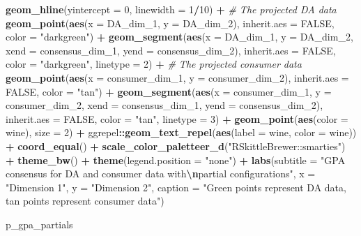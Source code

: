 \documentclass[
]{book}
\newenvironment{Shaded}{\begin{snugshade}}{\end{snugshade}}
\newcommand{\AttributeTok}[1]{\textcolor[rgb]{0.13,0.29,0.53}{#1}}
\newcommand{\CommentTok}[1]{\textcolor[rgb]{0.56,0.35,0.01}{\textit{#1}}}
\newcommand{\ConstantTok}[1]{\textcolor[rgb]{0.56,0.35,0.01}{#1}}
\newcommand{\DecValTok}[1]{\textcolor[rgb]{0.00,0.00,0.81}{#1}}
\newcommand{\FunctionTok}[1]{\textcolor[rgb]{0.13,0.29,0.53}{\textbf{#1}}}
\newcommand{\NormalTok}[1]{#1}
\newcommand{\SpecialCharTok}[1]{\textcolor[rgb]{0.81,0.36,0.00}{\textbf{#1}}}
\newcommand{\StringTok}[1]{\textcolor[rgb]{0.31,0.60,0.02}{#1}}
\begin{document}
\begin{Shaded}
\begin{Highlighting}[]
  \FunctionTok{geom\_hline}\NormalTok{(}\AttributeTok{yintercept =} \DecValTok{0}\NormalTok{, }\AttributeTok{linewidth =} \DecValTok{1}\SpecialCharTok{/}\DecValTok{10}\NormalTok{) }\SpecialCharTok{+} 
  \CommentTok{\# The projected DA data}
  \FunctionTok{geom\_point}\NormalTok{(}\FunctionTok{aes}\NormalTok{(}\AttributeTok{x =}\NormalTok{ DA\_dim\_1, }\AttributeTok{y =}\NormalTok{ DA\_dim\_2),}
             \AttributeTok{inherit.aes =} \ConstantTok{FALSE}\NormalTok{, }\AttributeTok{color =} \StringTok{"darkgreen"}\NormalTok{) }\SpecialCharTok{+} 
  \FunctionTok{geom\_segment}\NormalTok{(}\FunctionTok{aes}\NormalTok{(}\AttributeTok{x =}\NormalTok{ DA\_dim\_1, }\AttributeTok{y =}\NormalTok{ DA\_dim\_2, }\AttributeTok{xend =}\NormalTok{ consensus\_dim\_1, }\AttributeTok{yend =}\NormalTok{ consensus\_dim\_2),}
               \AttributeTok{inherit.aes =} \ConstantTok{FALSE}\NormalTok{, }\AttributeTok{color =} \StringTok{"darkgreen"}\NormalTok{, }\AttributeTok{linetype =} \DecValTok{2}\NormalTok{) }\SpecialCharTok{+} 
  \CommentTok{\# The projected consumer data}
  \FunctionTok{geom\_point}\NormalTok{(}\FunctionTok{aes}\NormalTok{(}\AttributeTok{x =}\NormalTok{ consumer\_dim\_1, }\AttributeTok{y =}\NormalTok{ consumer\_dim\_2),}
             \AttributeTok{inherit.aes =} \ConstantTok{FALSE}\NormalTok{, }\AttributeTok{color =} \StringTok{"tan"}\NormalTok{) }\SpecialCharTok{+} 
  \FunctionTok{geom\_segment}\NormalTok{(}\FunctionTok{aes}\NormalTok{(}\AttributeTok{x =}\NormalTok{ consumer\_dim\_1, }\AttributeTok{y =}\NormalTok{ consumer\_dim\_2, }\AttributeTok{xend =}\NormalTok{ consensus\_dim\_1, }\AttributeTok{yend =}\NormalTok{ consensus\_dim\_2),}
               \AttributeTok{inherit.aes =} \ConstantTok{FALSE}\NormalTok{, }\AttributeTok{color =} \StringTok{"tan"}\NormalTok{, }\AttributeTok{linetype =} \DecValTok{3}\NormalTok{) }\SpecialCharTok{+} 
  \FunctionTok{geom\_point}\NormalTok{(}\FunctionTok{aes}\NormalTok{(}\AttributeTok{color =}\NormalTok{ wine), }\AttributeTok{size =} \DecValTok{2}\NormalTok{) }\SpecialCharTok{+}
\NormalTok{  ggrepel}\SpecialCharTok{::}\FunctionTok{geom\_text\_repel}\NormalTok{(}\FunctionTok{aes}\NormalTok{(}\AttributeTok{label =}\NormalTok{ wine, }\AttributeTok{color =}\NormalTok{ wine)) }\SpecialCharTok{+} 
  \FunctionTok{coord\_equal}\NormalTok{() }\SpecialCharTok{+} 
  \FunctionTok{scale\_color\_paletteer\_d}\NormalTok{(}\StringTok{"RSkittleBrewer::smarties"}\NormalTok{) }\SpecialCharTok{+}
  \FunctionTok{theme\_bw}\NormalTok{() }\SpecialCharTok{+} 
  \FunctionTok{theme}\NormalTok{(}\AttributeTok{legend.position =} \StringTok{"none"}\NormalTok{) }\SpecialCharTok{+}
  \FunctionTok{labs}\NormalTok{(}\AttributeTok{subtitle =} \StringTok{"GPA consensus for DA and consumer data with}\SpecialCharTok{\textbackslash{}n}\StringTok{partial configurations"}\NormalTok{,}
       \AttributeTok{x =} \StringTok{"Dimension 1"}\NormalTok{,}
       \AttributeTok{y =} \StringTok{"Dimension 2"}\NormalTok{,}
       \AttributeTok{caption =} \StringTok{"Green points represent DA data, tan points represent consumer data"}\NormalTok{)}

\NormalTok{p\_gpa\_partials}
\end{Highlighting}
\end{Shaded}
\end{document}
